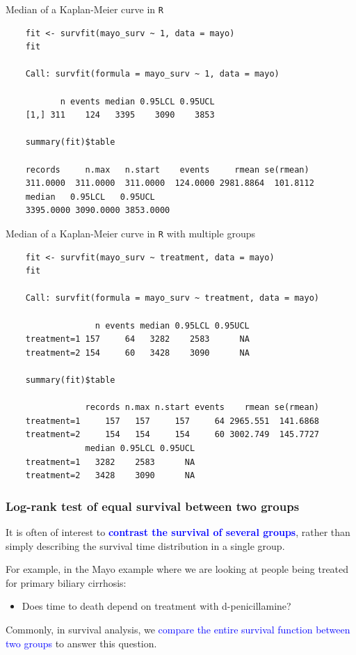 \documentclass[10pt,t]{beamer}
\begin{document}
\begin{frame}[fragile]{Median of a Kaplan-Meier curve in \texttt{R}} 
	\vspace{-0.5cm}
	
	
	\small
	\begin{verbatim}
	fit <- survfit(mayo_surv ~ 1, data = mayo)
	fit
	
	Call: survfit(formula = mayo_surv ~ 1, data = mayo)
	
	       n events median 0.95LCL 0.95UCL
	[1,] 311    124   3395    3090    3853
	
	summary(fit)$table
	
	records     n.max   n.start    events     rmean se(rmean) 
	311.0000  311.0000  311.0000  124.0000 2981.8864  101.8112 
	median   0.95LCL   0.95UCL 
	3395.0000 3090.0000 3853.0000
	\end{verbatim}
\end{frame}

\begin{frame}[fragile]{Median of a Kaplan-Meier curve in \texttt{R} with multiple groups} 
	\vspace{-0.5cm}
	\small
	\begin{verbatim}
	fit <- survfit(mayo_surv ~ treatment, data = mayo)
	fit
	
	Call: survfit(formula = mayo_surv ~ treatment, data = mayo)
	
	              n events median 0.95LCL 0.95UCL
	treatment=1 157     64   3282    2583      NA
	treatment=2 154     60   3428    3090      NA
	
	summary(fit)$table
	
	            records n.max n.start events    rmean se(rmean) 
	treatment=1     157   157     157     64 2965.551  141.6868   
	treatment=2     154   154     154     60 3002.749  145.7727   
	            median 0.95LCL 0.95UCL
	treatment=1   3282    2583      NA
	treatment=2   3428    3090      NA
	\end{verbatim}
\end{frame}

\begin{frame}
\frametitle{Log-rank test of equal survival between two groups}

It is often of interest to \textcolor{blue}{\textbf{contrast the survival of several groups}}, rather than simply describing the survival time distribution in a single group. 

\medskip
For example, in the Mayo example where we are looking at people being treated for primary biliary cirrhosis:

\medskip
\begin{itemize}
\item Does time to death depend on treatment with d-penicillamine? 
\end{itemize}


\medskip

Commonly, in survival analysis, we \textcolor{blue}{compare the entire survival function between two groups} to answer this question.
\end{frame}
\end{document}
